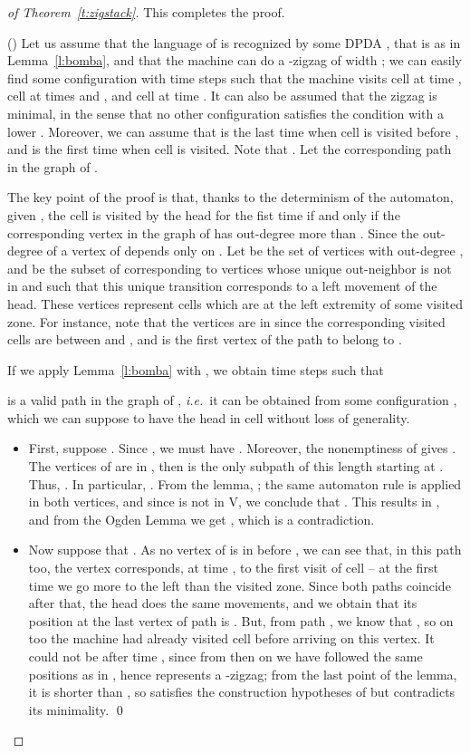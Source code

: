 \documentclass{llncs}
\newcommand{\ie}{\textit{i.e.}\ }
\begin{document}
\begin{proof}[of Theorem~\ref{t:zigstack}]
This completes the proof.

()
Let us assume that the language of  is recognized by some DPDA , that  is as in Lemma~\ref{l:bomba}, and that the machine can do a -zigzag of width ;  we can easily find some configuration  with time steps  such that the machine visits cell  at time , cell  at times  and , and cell  at time .
It can also be assumed that the zigzag is minimal, in the sense that no other configuration satisfies the condition with a lower . Moreover, we can assume that  is the last time when cell  is visited before , and  is the first time when cell  is visited. Note that . Let  the corresponding path in the graph of .

The key point of the proof is that, thanks to the determinism of the automaton, given , the  cell is visited by the head for the fist time if and only if the corresponding vertex in the graph of  has out-degree more than .
Since the out-degree of a vertex  of  depends only on .
Let  be the set of vertices with out-degree , and  be the subset of  corresponding to vertices whose unique out-neighbor is not in  and such that this unique transition corresponds to a left movement of the head. These vertices represent cells which are at the left extremity of some visited zone.
For instance, note that the vertices  are in  since the corresponding visited cells are between  and , and  is the first vertex of the path  to belong to .

If we apply Lemma~\ref{l:bomba} with , we obtain time steps  such that 

is a valid path in the graph of , \ie it can be obtained from some configuration , which we can suppose to have the head in cell  without loss of generality.

\begin{itemize}
\item First, suppose . 
Since , we must have .
Moreover, the nonemptiness of  gives .
The vertices of  are in , then  is the only subpath of this length starting at .
Thus, .
In particular, .
From the lemma, ; the same automaton rule is applied in both vertices, and since  is not in V, we conclude that  .
This results in , and from the Ogden Lemma we get , which is a contradiction.

\item Now suppose that . As no vertex of  is in  before , we can see that, in this path too, the vertex  corresponds, at time , to the first visit of cell  -- at the first time we go more to the left than the visited zone.
Since both paths coincide after that, the head does the same movements, and we obtain that its position at the last vertex  of path  is . But, from path , we know that , so on  too the machine had already visited cell  before arriving on this vertex. It could not be after time , since from then on we have followed the same positions as in , hence  represents a -zigzag; from the last point of the lemma, it is shorter than , so  satisfies the construction hypotheses of  but contradicts its minimality.
\qed
\end{itemize}
\end{proof}
\end{document}
